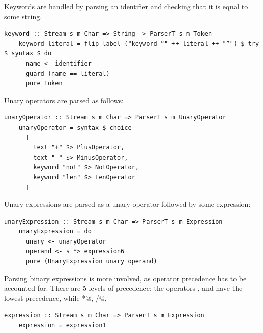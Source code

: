 \documentclass[UdineBachThesis,american,11pt]{PhdThesis}
\begin{document}
  Keywords are handled by parsing an identifier and checking that it is equal to
  some string.

  \begin{lstlisting}[gobble=4,basicstyle=\ttfamily\small]
    keyword :: Stream s m Char => String -> ParserT s m Token
    keyword literal = flip label ("keyword “" ++ literal ++ "”") $ try $ syntax $ do
      name <- identifier
      guard (name == literal)
      pure Token
  \end{lstlisting}

  Unary operators are parsed as follows:

  \begin{lstlisting}[gobble=4,basicstyle=\ttfamily\small]
    unaryOperator :: Stream s m Char => ParserT s m UnaryOperator
    unaryOperator = syntax $ choice
      [
        text "+" $> PlusOperator,
        text "-" $> MinusOperator,
        keyword "not" $> NotOperator,
        keyword "len" $> LenOperator
      ]
  \end{lstlisting}

  Unary expressions are parsed as a unary operator followed by some expression:

  \begin{lstlisting}[gobble=4,basicstyle=\ttfamily\small]
    unaryExpression :: Stream s m Char => ParserT s m Expression
    unaryExpression = do
      unary <- unaryOperator
      operand <- s *> expression6
      pure (UnaryExpression unary operand)
  \end{lstlisting}

  Parsing binary expressions is more involved, as operator precedence has to be
  accounted for. There are 5 levels of precedence: the operators
  \lstinline@and@, \lstinline@or@ and \lstinline@xor@ have the lowest
  precedence, while \lstinline@*@, \lstinline@/@,
  \lstinline@%@ have the highest.

  \begin{lstlisting}[gobble=4,basicstyle=\ttfamily\small]
    expression :: Stream s m Char => ParserT s m Expression
    expression = expression1
  \end{lstlisting}

  \newpage
\end{document}
